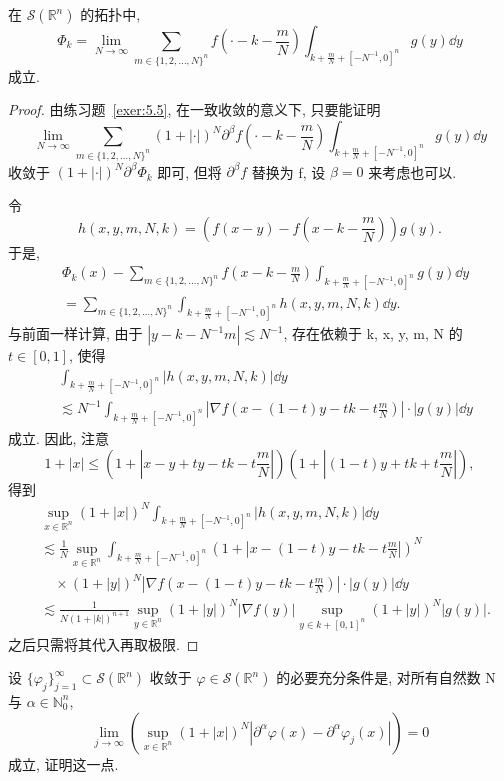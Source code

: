 \begin{lemma}\label{lem:5.2}
在 $\mathcal{S}(\mathbb{R}^{n})$ 的拓扑中,
\[
\Phi_{k} = \lim_{N \to \infty}\sum_{m \in \{1, 2, \ldots, N\}^{n}}f\left(\cdot - k - \frac{m}{N}\right)\int_{k+\frac{m}{N}+[-N^{-1},0]^{n}}g(y)\dd y
\]
成立.
\end{lemma}

\begin{proof}
由练习题~\ref{exer:5.5}, 在一致收敛的意义下, 只要能证明
\[
\lim_{N \to \infty}\sum_{m \in \{1, 2, \ldots, N\}^{n}}(1+|\cdot|)^{N}\partial^{\beta}f\left(\cdot - k - \frac{m}{N}\right)\int_{k+\frac{m}{N}+[-N^{-1},0]^{n}}g(y)\dd y
\]
收敛于 $(1+|\cdot|)^{N}\partial^{\beta}\Phi_{k}$ 即可, 但将 $\partial^{\beta}f$ 替换为 f, 设 $\beta = 0$ 来考虑也可以.

令
\[
h(x, y, m, N, k) = \left(f(x-y) - f\left(x - k - \frac{m}{N}\right)\right)g(y).
\]
于是,
\begin{align*}
&\Phi_{k}(x) - \sum_{m \in \{1, 2, \ldots, N\}^{n}}f\left(x - k - \frac{m}{N}\right)\int_{k+\frac{m}{N}+[-N^{-1},0]^{n}}g(y)\dd y \\
&= \sum_{m \in \{1, 2, \ldots, N\}^{n}}\int_{k+\frac{m}{N}+[-N^{-1},0]^{n}}h(x, y, m, N, k)\dd y.
\end{align*}
与前面一样计算, 由于 $|y - k - N^{-1}m| \lesssim N^{-1}$, 存在依赖于 k, x, y, m, N 的 $t \in [0, 1]$, 使得
\begin{align*}
&\int_{k+\frac{m}{N}+[-N^{-1},0]^{n}}|h(x, y, m, N, k)|\dd y \\
&\lesssim N^{-1}\int_{k+\frac{m}{N}+[-N^{-1},0]^{n}}\left|\nabla f\left(x - (1-t)y - tk - t\frac{m}{N}\right)\right| \cdot |g(y)|\dd y
\end{align*}
成立. 因此, 注意
\[
1 + |x| \leq \left(1 + \left|x - y + ty - tk - t\frac{m}{N}\right|\right)\left(1 + \left|(1-t)y + tk + t\frac{m}{N}\right|\right),
\]
得到
\begin{align*}
&\sup_{x \in \mathbb{R}^{n}}(1+|x|)^{N}\int_{k+\frac{m}{N}+[-N^{-1},0]^{n}}|h(x, y, m, N, k)|\dd y \\
&\lesssim \frac{1}{N}\sup_{x \in \mathbb{R}^{n}}\int_{k+\frac{m}{N}+[-N^{-1},0]^{n}}\left(1 + \left|x - (1-t)y - tk - t\frac{m}{N}\right|\right)^{N} \\
&\quad \times (1+|y|)^{N}\left|\nabla f\left(x - (1-t)y - tk - t\frac{m}{N}\right)\right| \cdot |g(y)|\dd y \\
&\lesssim \frac{1}{N(1+|k|)^{n+1}}\sup_{y \in \mathbb{R}^{n}}(1+|y|)^{N}|\nabla f(y)|\sup_{y \in k+[0,1]^{n}}(1+|y|)^{N}|g(y)|.
\end{align*}
之后只需将其代入再取极限.
\end{proof}

\begin{exercise}\label{exer:5.5}
设 $\{\varphi_{j}\}_{j=1}^{\infty} \subset \mathcal{S}(\mathbb{R}^{n})$ 收敛于 $\varphi \in \mathcal{S}(\mathbb{R}^{n})$ 的必要充分条件是, 对所有自然数 N 与 $\alpha \in \mathbb{N}_{0}^{n}$,
\begin{equation}\tag{5.4}
\lim_{j \to \infty}\left(\sup_{x \in \mathbb{R}^{n}}(1+|x|)^{N}|\partial^{\alpha}\varphi(x) - \partial^{\alpha}\varphi_{j}(x)|\right) = 0
\label{eq:5.4}
\end{equation}
成立, 证明这一点.
\end{exercise}

